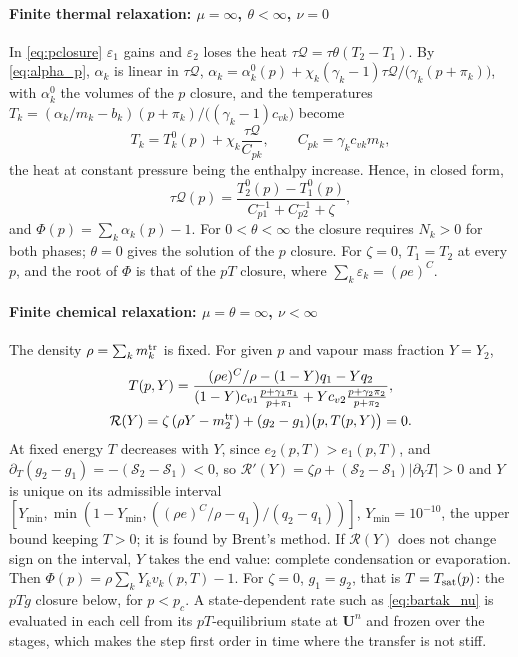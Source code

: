 \documentclass[a4paper,fleqn]{cas-sc}
\begin{document}
\paragraph{Finite thermal relaxation: $\mu=\infty$, $\theta<\infty$, $\nu=0$}
In \eqref{eq:pclosure} $\varepsilon_1$ gains and $\varepsilon_2$ loses the heat $\tau\mathcal Q=\tau\theta(T_2-T_1)$. By \eqref{eq:alpha_p}, $\alpha_k$ is linear in
$\tau\mathcal Q$, $\alpha_k=\alpha^0_k(p)+\chi_k(\gamma_k-1)\tau\mathcal Q/\big(\gamma_k(p+\pi_k)\big)$, with $\alpha^0_k$ the volumes of the $p$ closure, and the
temperatures $T_k=(\alpha_k/m_k-b_k)(p+\pi_k)/\big((\gamma_k-1)c_{vk}\big)$ become
\[
T_k=T^0_k(p)+\chi_k\frac{\tau\mathcal Q}{C_{pk}},\qquad C_{pk}=\gamma_kc_{vk}m_k ,
\]
the heat at constant pressure being the enthalpy increase. Hence, in closed form,
\begin{equation}
\tau\mathcal Q(p)=\frac{T^0_2(p)-T^0_1(p)}{C_{p1}^{-1}+C_{p2}^{-1}+\zeta},
\label{eq:dQ}
\end{equation}
and $\Phi(p)=\sum_k\alpha_k(p)-1$. For $0<\theta<\infty$ the closure requires $N_k>0$ for both phases; $\theta=0$ gives the solution
of the $p$ closure. For $\zeta=0$, $T_1=T_2$ at every $p$, and the root of $\Phi$ is that of the $pT$ closure, where
$\sum_k\varepsilon_k=(\rho e)^C$.

\paragraph{Finite chemical relaxation: $\mu=\theta=\infty$, $\nu<\infty$}
The density $\rho=\sum_km^{\rm tr}_k$ is fixed. For given $p$ and vapour mass fraction $Y=Y_2$,
\begin{equation}
\begin{gathered}
T(p,Y)=\frac{(\rho e)^C/\rho-(1-Y)q_1-Yq_2}{(1-Y)c_{v1}\frac{p+\gamma_1\pi_1}{p+\pi_1}+Yc_{v2}\frac{p+\gamma_2\pi_2}{p+\pi_2}},\\
\mathcal R(Y)=\zeta\,(\rho Y-m^{\rm tr}_2)+(g_2-g_1)\big(p,T(p,Y)\big)=0 .
\end{gathered}
\label{eq:nuclosure}
\end{equation}
At fixed energy $T$ decreases with $Y$, since $e_2(p,T)>e_1(p,T)$, and $\partial_T(g_2-g_1)=-(\mathcal S_2-\mathcal S_1)<0$, so
$\mathcal R'(Y)=\zeta\rho+(\mathcal S_2-\mathcal S_1)|\partial_YT|>0$ and $Y$ is unique on its admissible interval
$[Y_{\min},\min(1-Y_{\min},((\rho e)^C/\rho-q_1)/(q_2-q_1))]$, $Y_{\min}=10^{-10}$, the upper bound keeping $T>0$; it is found by Brent's method. If $\mathcal R(Y)$ does not change sign on the interval, $Y$ takes
the end value: complete condensation or evaporation. Then $\Phi(p)=\rho\sum_kY_kv_k(p,T)-1$. For $\zeta=0$, $g_1=g_2$, that is
$T=T_{\rm sat}(p)$: the $pTg$ closure below, for $p<p_c$. A state-dependent rate such as \eqref{eq:bartak_nu}
is evaluated in each cell from its $pT$-equilibrium state at $\mathbf U^n$ and frozen over the stages, which makes the step first
order in time where the transfer is not stiff.
\end{document}
